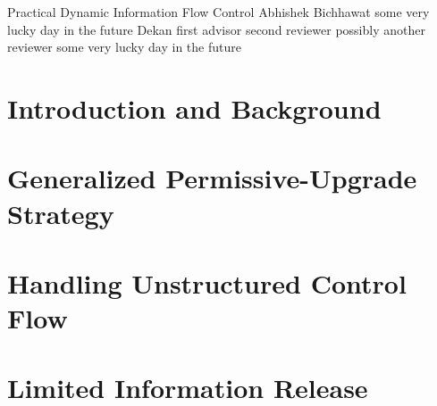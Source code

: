 \documentclass[a4paper,10pt,twoside,openright]{book}
\begin{document}
\frontmatter

\ThesisTitle
    {Practical Dynamic Information Flow Control} %
    {Abhishek Bichhawat}               %
    {some very lucky day in the future}                  %
    {Dekan}									%
    {first advisor}                %
    {second reviewer}            %
    {possibly another reviewer}						%
    {some very lucky day in the future}                  %




\pagestyle{empty}

\clearpage

% 
\clearpage


\clearpage


\pagestyle{fancyplain} %
\tableofcontents
{}


\mainmatter\setcounter{page}{1}

\cleardoublepage
\part{Introduction and Background}
\cleardoublepage


% 

\cleardoublepage
\part{Generalized Permissive-Upgrade Strategy}
\cleardoublepage



\cleardoublepage
\part{Handling Unstructured Control Flow} 
\cleardoublepage


\cleardoublepage
\part{Limited Information Release}
\cleardoublepage

\end{document}
